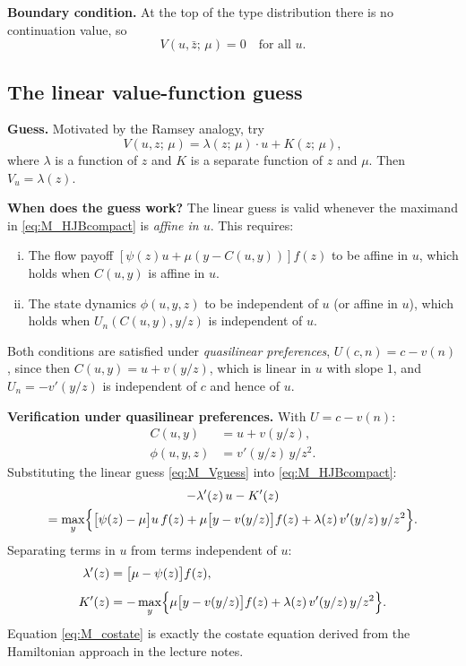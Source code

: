 \documentclass[12pt]{article}
\newcommand{\zbar}{\bar{z}}
\begin{document}
\noindent\textbf{Boundary condition.}  At the top of the type distribution
there is no continuation value, so
\begin{equation}\label{eq:M_HJBBC}
  V(u, \zbar;\, \mu) = 0 \quad \text{for all } u.
\end{equation}

\subsection{The linear value-function guess}

\noindent\textbf{Guess.}  Motivated by the Ramsey analogy, try
\begin{equation}\label{eq:M_Vguess}
  V(u, z;\, \mu) = \lambda(z;\, \mu)\cdot u + K(z;\, \mu),
\end{equation}
where $\lambda$ is a function of $z$ and $K$ is a separate function of $z$ and
$\mu$.  Then $V_u = \lambda(z)$.

\medskip\noindent\textbf{When does the guess work?}  The linear guess is valid
whenever the maximand in \eqref{eq:M_HJBcompact} is \emph{affine in $u$}.
This requires:
\begin{enumerate}[(i)]
  \item The flow payoff $[\psi(z) u + \mu(y - C(u,y))] f(z)$ to be affine in $u$, which holds when $C(u, y)$ is affine in $u$.
  \item The state dynamics $\phi(u, y, z)$ to be independent of $u$ (or affine in $u$), which holds when $U_n(C(u,y), y/z)$ is independent of $u$.
\end{enumerate}
Both conditions are satisfied under \emph{quasilinear preferences}, $U(c,n) =
c - v(n)$, since then $C(u, y) = u + v(y/z)$, which is linear in $u$ with
slope $1$, and $U_n = -v'(y/z)$ is independent of $c$ and hence of $u$.

\medskip\noindent\textbf{Verification under quasilinear preferences.}  With
$U = c - v(n)$:
\begin{align*}
  C(u, y) &= u + v(y/z), \\
  \phi(u, y, z) &= v'(y/z)\, y/z^2.
\end{align*}
Substituting the linear guess \eqref{eq:M_Vguess} into \eqref{eq:M_HJBcompact}:
\begin{multline*}
  -\lambda'(z)\, u - K'(z) \\
  = \max_y \Bigl\{
  \bigl[\psi(z) - \mu\bigr] u\, f(z)
  + \mu\bigl[y - v(y/z)\bigr] f(z)
  + \lambda(z)\, v'(y/z)\, y/z^2
  \Bigr\}.
\end{multline*}
Separating terms in $u$ from terms independent of $u$:
\begin{align}
  \lambda'(z) &= \bigl[\mu - \psi(z)\bigr] f(z),
  \label{eq:M_costate} \\[4pt]
  K'(z) &= -\max_{y}\Bigl\{\mu\bigl[y - v(y/z)\bigr] f(z)
             + \lambda(z)\, v'(y/z)\, y/z^2\Bigr\}.
  \label{eq:M_Kode}
\end{align}
Equation \eqref{eq:M_costate} is exactly the costate equation derived from the
Hamiltonian approach in the lecture notes.
\end{document}
